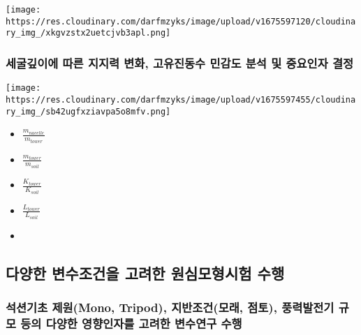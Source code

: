 \documentclass[
  letterpaper,
  DIV=11,
  numbers=noendperiod]{scrreprt}
\providecommand{\tightlist}{%
  \setlength{\itemsep}{0pt}\setlength{\parskip}{0pt}}\usepackage{longtable,booktabs,array}
\begin{document}
\texttt{[image: https://res.cloudinary.com/darfmzyks/image/upload/v1675597120/cloudinary\_img\_/xkgvzstx2uetcjvb3apl.png]}

\hypertarget{uxc138uxad74uxae4auxc774uxc5d0-uxb530uxb978-uxc9c0uxc9c0uxb825-uxbcc0uxd654-uxace0uxc720uxc9c4uxb3d9uxc218-uxbbfcuxac10uxb3c4-uxbd84uxc11d-uxbc0f-uxc911uxc694uxc778uxc790-uxacb0uxc815}{%
\subsubsection{세굴깊이에 따른 지지력 변화, 고유진동수 민감도 분석 및
중요인자
결정}\label{uxc138uxad74uxae4auxc774uxc5d0-uxb530uxb978-uxc9c0uxc9c0uxb825-uxbcc0uxd654-uxace0uxc720uxc9c4uxb3d9uxc218-uxbbfcuxac10uxb3c4-uxbd84uxc11d-uxbc0f-uxc911uxc694uxc778uxc790-uxacb0uxc815}}

\texttt{[image: https://res.cloudinary.com/darfmzyks/image/upload/v1675597455/cloudinary\_img\_/sb42ugfxziavpa5o8mfv.png]}

\begin{itemize}
\tightlist
\item
  \(\frac{m_{nacelle}}{m_{tower}}\)
\item
  \(\frac{m_{tower}}{m_{soil}}\)
\item
  \(\frac{K_{tower}}{K_{soil}}\)
\item
  \(\frac{L_{tower}}{L_{soil}}\)
\item
\end{itemize}

\hypertarget{uxb2e4uxc591uxd55c-uxbcc0uxc218uxc870uxac74uxc744-uxace0uxb824uxd55c-uxc6d0uxc2ecuxbaa8uxd615uxc2dcuxd5d8-uxc218uxd589}{%
\subsection{다양한 변수조건을 고려한 원심모형시험
수행}\label{uxb2e4uxc591uxd55c-uxbcc0uxc218uxc870uxac74uxc744-uxace0uxb824uxd55c-uxc6d0uxc2ecuxbaa8uxd615uxc2dcuxd5d8-uxc218uxd589}}

\hypertarget{uxc11duxc158uxae30uxcd08-uxc81cuxc6d0mono-tripod-uxc9c0uxbc18uxc870uxac74uxbaa8uxb798-uxc810uxd1a0-uxd48duxb825uxbc1cuxc804uxae30-uxaddcuxbaa8-uxb4f1uxc758-uxb2e4uxc591uxd55c-uxc601uxd5a5uxc778uxc790uxb97c-uxace0uxb824uxd55c-uxbcc0uxc218uxc5f0uxad6c-uxc218uxd589}{%
\subsubsection{석션기초 제원(Mono, Tripod), 지반조건(모래, 점토),
풍력발전기 규모 등의 다양한 영향인자를 고려한 변수연구
수행}\label{uxc11duxc158uxae30uxcd08-uxc81cuxc6d0mono-tripod-uxc9c0uxbc18uxc870uxac74uxbaa8uxb798-uxc810uxd1a0-uxd48duxb825uxbc1cuxc804uxae30-uxaddcuxbaa8-uxb4f1uxc758-uxb2e4uxc591uxd55c-uxc601uxd5a5uxc778uxc790uxb97c-uxace0uxb824uxd55c-uxbcc0uxc218uxc5f0uxad6c-uxc218uxd589}}
\end{document}
